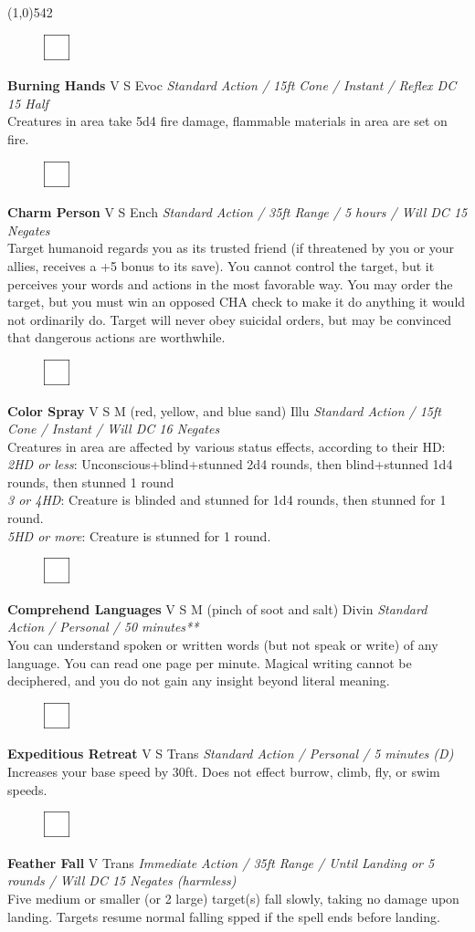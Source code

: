 \documentclass[letterpaper]{article}
\newcommand{\fullline}{\noindent\line(1,0){542} \\}
\newcommand{\spell}[7]{
\begin{figure}
\vspace{-13pt}
\ifstrequal{#2}{Full}{\includegraphics[width=2em]{Checkbox-Full}}{
                      \includegraphics[width=2em]{Checkbox}}
\ifstrequal{#7}{}{\vspace{-1em}}{\vspace{#7}}
\end{figure}
\noindent \textbf{#1} #3 {
    \ifstrequal{#4}{Conj}{\color{Plum}Conj}{%
    \ifstrequal{#4}{Divin}{\color{YellowOrange}Divin}{%
    \ifstrequal{#4}{Ench}{\color{VioletRed}Ench}{%
    \ifstrequal{#4}{Trans}{\color{LimeGreen}Trans}{%
    \ifstrequal{#4}{Evoc}{\color{RedOrange}Evoc}{%
    \ifstrequal{#4}{Illu}{\color{ProcessBlue}Illu}{%
    \ifstrequal{#4}{Abjur}{\color{CadetBlue}Abjur}{%
    \ifstrequal{#4}{Necro}{\color{Red}Necro}{%
}}}}}}}}}
{\footnotesize \emph{#5}} \\
#6
}
\begin{document}
\fullline
\vspace{-1.25em}

\spell{Burning Hands}{}{V S}{Evoc}{Standard Action / 15ft Cone / Instant / Reflex DC 15 Half}{%
Creatures in area take 5d4 fire damage, flammable materials in area are set on fire.}{}\\[-1em] %

\spell{Charm Person}{}{V S}{Ench}{Standard Action / 35ft Range / 5 hours / Will DC 15 \nolinebreak Negates}{%
Target humanoid regards you as its trusted friend (if threatened by you or your allies, receives a +5 bonus to its save).  You cannot control the target, but it perceives your words and actions in the most favorable way.  You may order the target, but you must win an opposed CHA check to make it do anything it would not ordinarily do.  Target will never obey suicidal orders, but may be convinced that dangerous actions are worthwhile.}{1em} %

\spell{Color Spray}{}{V S M (red, yellow, and blue sand)}{Illu}{Standard Action / 15ft Cone / Instant / Will DC 16 Negates}{%
Creatures in area are affected by various status effects, according to their HD:\\
\emph{2HD or less}: Unconscious+blind+stunned 2d4 rounds, then blind+stunned 1d4 rounds, then stunned 1 round \\
\emph{3 or 4HD}: Creature is blinded and stunned for 1d4 rounds, then stunned for 1 round.\\
\emph{5HD or more}: Creature is stunned for 1 round.}{1em}

\spell{Comprehend Languages}{}{V S M (pinch of soot and salt)}{Divin}{Standard Action / Personal / 50 minutes**}{%
You can understand spoken or written words (but not speak or write) of any language. You can read one page per minute. Magical writing cannot be deciphered, and you do not gain any insight beyond literal meaning.}{} %

\spell{Expeditious Retreat}{}{V S}{Trans}{Standard Action / Personal / 5 minutes (D)}{%
Increases your base speed by 30ft.  Does not effect burrow, climb, fly, or swim speeds.}{}\\[-1em] %

\spell{Feather Fall}{}{V}{Trans}{Immediate Action / 35ft Range / Until Landing or 5 rounds / Will DC 15 Negates (harmless)}{%
Five medium or smaller (or 2 large) target(s) fall slowly, taking no damage upon landing. Targets resume normal falling spped if the spell ends before landing.}{} %
\end{document}
